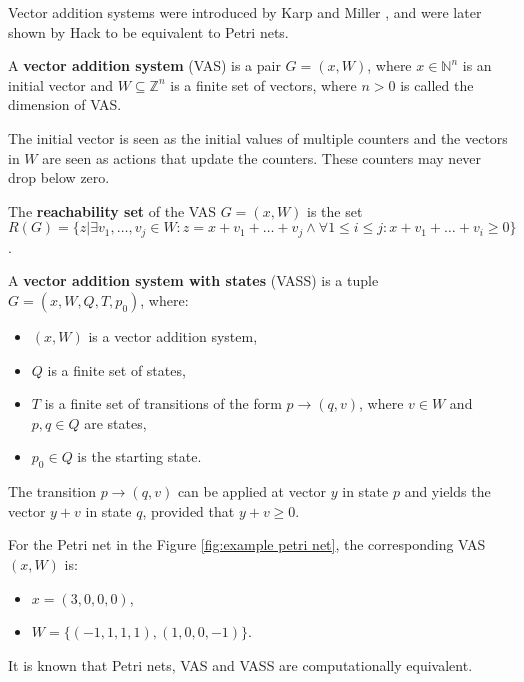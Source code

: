 Vector addition systems were introduced by Karp and Miller \cite{Karp69ParallelProgramSchemata}, and were later shown by Hack \cite{Hack74PetriVAS} to be equivalent to Petri nets.

\begin{definition}
  A {\bf vector addition system} (VAS) is a pair $G = (x, W)$, where $x\in \mathbb N^n$ is an initial vector and $W\subseteq \mathbb Z^n$ is a finite set of vectors, where $n>0$ is called the dimension of VAS.
\end{definition}

The initial vector is seen as the initial values of multiple counters and the vectors in $W$ are seen as actions that update the counters. These counters may never drop below zero. 

\begin{definition}
  The {\bf reachability set} of the VAS $G = (x,W)$ is the set \linebreak $R(G) = \{z | \exists v_1,\ldots,v_j\in W: z=x+v_1+\ldots+v_j \wedge \forall 1\leq i\leq j: x+v_1+\ldots+v_i\geq 0\}$.
\end{definition}

\begin{definition}
  A {\bf vector addition system with states} (VASS) is a tuple $G = (x, W, Q, T, p_0)$, where:
  \begin{itemize}
    \item $(x, W)$ is a vector addition system,
    \item $Q$ is a finite set of states,
    \item $T$ is a finite set of transitions of the form $p\rightarrow(q,v)$, where $v\in W$ and $p,q\in Q$ are states,
    \item $p_0\in Q$ is the starting state.
  \end{itemize}
\end{definition}

The transition $p\rightarrow(q,v)$ can be applied at vector $y$ in state $p$ and yields the vector $y+v$ in state $q$, provided that $y+v\geq 0$.

\begin{example}
  For the Petri net in the Figure \ref{fig:example petri net}, the corresponding VAS $(x,W)$ is:
  \begin{itemize}
    \item $x=(3,0,0,0)$,
    \item $W=\{(-1,1,1,1),(1,0,0,-1)\}$.
  \end{itemize}
\end{example}

It is known \cite{Hack74PetriVAS} that Petri nets, VAS and VASS are computationally equivalent.

